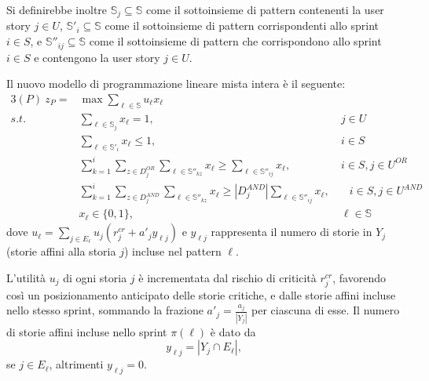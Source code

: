 \documentclass[12pt,a4paper,openright,twoside]{book}
\begin{document}
Si definirebbe inoltre $\mathbb{S}_j \subseteq \mathbb{S}$ come il sottoinsieme di pattern contenenti la user story $j \in U$, $\mathbb{S}'_i \subseteq \mathbb{S}$ come il sottoinsieme di pattern corrispondenti allo sprint $i \in S$, e $\mathbb{S}''_{ij} \subseteq \mathbb{S}$ come il sottoinsieme di pattern che corrispondono allo sprint $i \in S$ e contengono la user story $j \in U$.

Il nuovo modello di programmazione lineare mista intera è il seguente:
\begin{alignat}{3}
(P) \: z_P  = & \max \sum_{\ell \in \mathbb{S}} u_{\ell} x_{\ell}                       &\               \label{Eq.F2.P1}\\
  s.t.\ & \sum_{\ell \in \mathbb{S}_j} x_{\ell} = 1,                                    &\ j \in U       \label{Eq.F2.P2}\\
        & \sum_{\ell \in \mathbb{S}'_i} x_{\ell} \leq 1,                                &\ i \in S       \label{Eq.F2.P3}\\
        & \sum_{k=1}^{i} \sum_{z \in D_j^{OR}} \sum_{\ell \in \mathbb{S}''_{kz}} x_{\ell} \geq \sum_{\ell \in \mathbb{S}''_{ij}} x_{\ell},
                                                                                        &\ i \in S, j \in U^{OR}      \label{Eq.F2.P4}\\
        & \sum_{k=1}^{i} \sum_{z \in D_j^{AND}} \sum_{\ell \in \mathbb{S}''_{kz}} x_{\ell} \geq |D_j^{AND}|\sum_{\ell \in \mathbb{S}''_{ij}} x_{\ell},
                                                                                        &\quad i \in S, j \in U^{AND} \label{Eq.F2.P5}\\
        & x_{\ell} \in \{0,1\},                                                         &\ \ell \in \mathbb{S}        \label{Eq.F2.P6}
\end{alignat}
dove $u_{\ell} = \sum_{j \in E_{\ell}} u_j \left( r_j^{cr} + a'_j y_{\ell j} \right)$ e $y_{\ell j}$ rappresenta il numero di storie in $Y_j$ (storie affini alla storia $j$) incluse nel pattern $\ell$.

L'utilità $u_j$ di ogni storia $j$ è incrementata dal rischio di criticità $r_j^{cr}$, favorendo così un posizionamento anticipato delle storie critiche, e dalle storie affini incluse nello stesso sprint, sommando la frazione $a'_j=\frac{a_j}{|Y_j|}$ per ciascuna di esse. Il numero di storie affini incluse nello sprint $\pi(\ell)$ è dato da 
\[
y_{\ell j} = |Y_j \cap E_{\ell}|,
\] 
se $j \in E_{\ell}$, altrimenti $y_{\ell j} = 0$.
\end{document}
